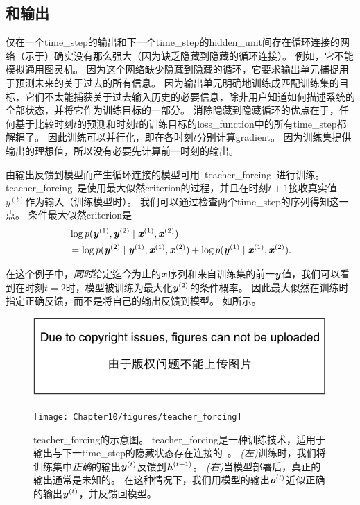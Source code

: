 
\subsection{和输出}
\label{sec:teacher_forcing_and_networks_with_output_recurrence}
仅在一个\gls{time_step}的输出和下一个\gls{time_step}的\gls{hidden_unit}间存在循环连接的网络（示于）确实没有那么强大（因为缺乏隐藏到隐藏的循环连接）。
例如，它不能模拟通用图灵机。
因为这个网络缺少隐藏到隐藏的循环，它要求输出单元捕捉用于预测未来的关于过去的所有信息。
因为输出单元明确地训练成匹配训练集的目标，它们不太能捕获关于过去输入历史的必要信息，除非用户知道如何描述系统的全部状态，并将它作为训练目标的一部分。
消除隐藏到隐藏循环的优点在于，任何基于比较时刻$t$的预测和时刻$t$的训练目标的\gls{loss_function}中的所有\gls{time_step}都解耦了。
因此训练可以并行化，即在各时刻$t$分别计算\gls{gradient}。
因为训练集提供输出的理想值，所以没有必要先计算前一时刻的输出。

由输出反馈到模型而产生循环连接的模型可用~\gls{teacher_forcing}~进行训练。
\gls{teacher_forcing}~是使用最大似然\gls{criterion}的过程，并且在时刻$t+1$接收真实值$y^{(t)}$作为输入（训练模型时）。
我们可以通过检查两个\gls{time_step}的序列得知这一点。
条件最大似然\gls{criterion}是
\begin{align}
 &\log p(\boldsymbol{\mathit{y}}^{(1)},\boldsymbol{\mathit{y}}^{(2)} \mid \boldsymbol{\mathit{x}}^{(1)}, \boldsymbol{\mathit{x}}^{(2)} ) \\
 &= \log  p(\boldsymbol{\mathit{y}}^{(2)} \mid \boldsymbol{\mathit{y}}^{(1)}, \boldsymbol{\mathit{x}}^{(1)}, \boldsymbol{\mathit{x}}^{(2)} )  + \log p(\boldsymbol{\mathit{y}}^{(1)} \mid \boldsymbol{\mathit{x}}^{(1)}, \boldsymbol{\mathit{x}}^{(2)}) .
\end{align}


在这个例子中，\emph{同时}给定迄今为止的$\boldsymbol{\mathit{x}}$序列和来自训练集的前一$\boldsymbol{\mathit{y}}$值，我们可以看到在时刻$t=2$时，模型被训练为最大化$\boldsymbol{\mathit{y}}^{(2)}$的条件概率。
因此最大似然在训练时指定正确反馈，而不是将自己的输出反馈到模型。
如所示。
\begin{figure}[!htb]
\ifOpenSource
\centerline{\includegraphics{figure.pdf}}
\else
\centerline{\texttt{[image: Chapter10/figures/teacher\_forcing]}}
\fi
\caption{\gls{teacher_forcing}的示意图。
\gls{teacher_forcing}是一种训练技术，适用于输出与下一\gls{time_step}的隐藏状态存在连接的~。
\emph{(左)}训练时，我们将训练集中\emph{正确}的输出$\boldsymbol{\mathit{y}}^{(t)}$反馈到$\boldsymbol{\mathit{h}}^{(t+1)}$。
\emph{(右)}当模型部署后，真正的输出通常是未知的。
在这种情况下，我们用模型的输出$\boldsymbol{\mathit{o}}^{(t)}$近似正确的输出$\boldsymbol{\mathit{y}}^{(t)}$，并反馈回模型。
}
\label{fig:chap10_teacher_forcing}
\end{figure}

